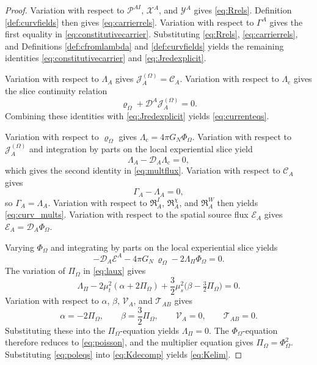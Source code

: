 \documentclass[11pt]{article}
\newcommand{\SpatialD}{\mathcal D}
\newcommand{\FlowPot}{\Phi_\Omega}
\newcommand{\BalanceField}{\Pi_\Omega}
\newcommand{\BalMult}{\Lambda_\Pi}
\newcommand{\SourceDensity}{\varrho_\Omega}
\newcommand{\SourceCurrent}{\mathcal J^{(\Omega)}}
\newcommand{\ConstCurrent}{\mathcal C}
\newcommand{\ContMult}{\Lambda_{\mathrm c}}
\newcommand{\CurrentMult}{\Lambda}
\newcommand{\ConstGamma}{\Gamma}
\newcommand{\CurvQMult}{\mathscr P}
\newcommand{\CurvChiMult}{\mathscr X}
\newcommand{\CurvTransMult}{\mathscr Y}
\newcommand{\SourceFlux}{\mathcal E}
\begin{document}
\begin{proof}
Variation with respect to \(\CurvQMult^{AI}\), \(\CurvChiMult^A\), and \(\CurvTransMult^A\) gives \eqref{eq:Rrels}. Definition \ref{def:curvfields} then gives \eqref{eq:carrierrels}. Variation with respect to \(\ConstGamma^A\) gives the first equality in \eqref{eq:constitutivecarrier}. Substituting \eqref{eq:Rrels}, \eqref{eq:carrierrels}, and Definitions \ref{def:cfromlambda} and \ref{def:curvfields} yields the remaining identities \eqref{eq:constitutivecarrier} and \eqref{eq:Jredexplicit}.

Variation with respect to \(\CurrentMult_A\) gives \(\SourceCurrent_A=\ConstCurrent_A\). Variation with respect to \(\ContMult\) gives the slice continuity relation
\[
\SourceDensity+\SpatialD^A\SourceCurrent_A=0.
\]
Combining these identities with \eqref{eq:Jredexplicit} yields \eqref{eq:currenteqs}.

Variation with respect to \(\SourceDensity\) gives \(\ContMult=4\pi G_N\FlowPot\). Variation with respect to \(\SourceCurrent_A\) and integration by parts on the local experiential slice yield
\[
\CurrentMult_A-\SpatialD_A\ContMult=0,
\]
which gives the second identity in \eqref{eq:multflux}. Variation with respect to \(\ConstCurrent_A\) gives
\[
\ConstGamma_A-\CurrentMult_A=0,
\]
so \(\ConstGamma_A=\CurrentMult_A\). Variation with respect to \(\mathfrak R_A^I\), \(\mathfrak R_A^\chi\), and \(\mathfrak R_A^W\) then yields \eqref{eq:curv_mults}. Variation with respect to the spatial source flux \(\SourceFlux_A\) gives \(\SourceFlux_A=\SpatialD_A\FlowPot\).

Varying \(\FlowPot\) and integrating by parts on the local experiential slice yields
\[
-\SpatialD_A\SourceFlux^A-4\pi G_N\,\SourceDensity-2\BalMult\FlowPot=0.
\]
The variation of \(\BalanceField\) in \eqref{eq:laux} gives
\[
\BalMult
-2\mu_t^2(\alpha+2\BalanceField)
+\frac32\mu_s^2\bigl(\beta-\tfrac32\BalanceField\bigr)=0.
\]
Variation with respect to \(\alpha\), \(\beta\), \(\mathcal V_A\), and \(\mathcal T_{AB}\) gives
\[
\alpha=-2\BalanceField,
\qquad
\beta=\frac32\BalanceField,
\qquad
\mathcal V_A=0,
\qquad
\mathcal T_{AB}=0.
\]
Substituting these into the \(\BalanceField\)-equation yields \(\BalMult=0\). The \(\FlowPot\)-equation therefore reduces to \eqref{eq:poisson}, and the multiplier equation gives \(\BalanceField=\FlowPot^2\). Substituting \eqref{eq:poleqs} into \eqref{eq:Kdecomp} yields \eqref{eq:Kelim}.
\end{proof}
\end{document}
